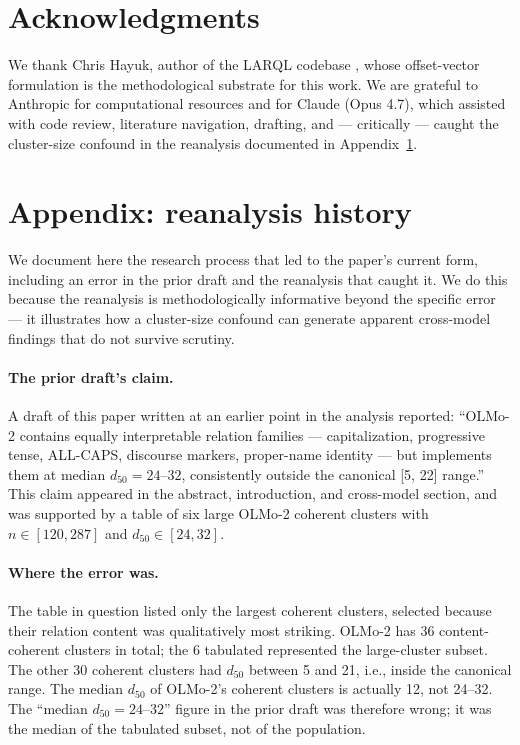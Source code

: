\documentclass[11pt,letterpaper]{article}
\begin{document}
\section*{Acknowledgments}

We thank Chris Hayuk, author of the LARQL codebase \citep{hayuk2026}, whose offset-vector formulation is the methodological substrate for this work. We are grateful to Anthropic for computational resources and for Claude (Opus 4.7), which assisted with code review, literature navigation, drafting, and --- critically --- caught the cluster-size confound in the reanalysis documented in Appendix~\ref{sec:reanalysis}.

\appendix

\section{Appendix: reanalysis history}
\label{sec:reanalysis}

We document here the research process that led to the paper's current form, including an error in the prior draft and the reanalysis that caught it. We do this because the reanalysis is methodologically informative beyond the specific error --- it illustrates how a cluster-size confound can generate apparent cross-model findings that do not survive scrutiny.

\paragraph{The prior draft's claim.} A draft of this paper written at an earlier point in the analysis reported: ``OLMo-2 contains equally interpretable relation families --- capitalization, progressive tense, ALL-CAPS, discourse markers, proper-name identity --- but implements them at median $d_{50} = 24$--$32$, consistently outside the canonical [5, 22] range.'' This claim appeared in the abstract, introduction, and cross-model section, and was supported by a table of six large OLMo-2 coherent clusters with $n \in [120, 287]$ and $d_{50} \in [24, 32]$.

\paragraph{Where the error was.} The table in question listed only the largest coherent clusters, selected because their relation content was qualitatively most striking. OLMo-2 has 36 content-coherent clusters in total; the 6 tabulated represented the large-cluster subset. The other 30 coherent clusters had $d_{50}$ between 5 and 21, i.e., inside the canonical range. The median $d_{50}$ of OLMo-2's coherent clusters is actually 12, not 24--32. The ``median $d_{50} = 24$--$32$'' figure in the prior draft was therefore wrong; it was the median of the tabulated subset, not of the population.
\end{document}
